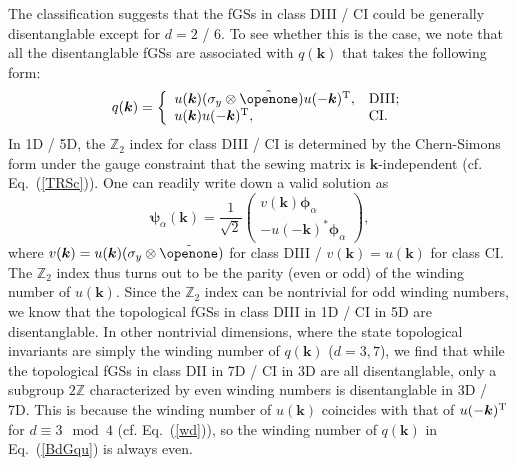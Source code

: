 \documentclass[prl,twocolumn,preprintnumbers,superscriptaddress,amsmath,amssymb]{revtex4-1}
\begin{document}
The classification suggests that the fGSs in class DIII / CI could be generally disentanglable except for $d=2$ / $6$. To see whether this is the case, we note that all the disentanglable fGSs are associated with $q(\boldsymbol{k})$ that takes the following form: 
\begin{equation}
q(\boldsymbol{k}) =\left\{\begin{array}{ll} u(\boldsymbol{k})(\sigma_y\otimes \tilde\openone)u(-\boldsymbol{k})^{\rm T}, & {\rm DIII};  \\ u(\boldsymbol{k})u(-\boldsymbol{k})^{\rm T}, & {\rm CI}. \end{array} \right.
\label{BdGqu}
\end{equation}
In 1D / 5D, the $\mathbb{Z}_2$ index for class DIII / CI is determined by the Chern-Simons form under the gauge constraint that the sewing matrix is $\boldsymbol{k}$-independent (cf. Eq.~(\ref{TRSc})). One can readily write down a valid solution as
\begin{equation}
\boldsymbol{\psi}_\alpha(\boldsymbol{k})=\frac{1}{\sqrt{2}}
\begin{pmatrix} v(\boldsymbol{k})\boldsymbol{\phi}_\alpha \\ -u(-\boldsymbol{k})^*\boldsymbol{\phi}_\alpha \end{pmatrix},
\end{equation}
where $v(\boldsymbol{k})= u(\boldsymbol{k})(\sigma_y\otimes\tilde\openone)$ for class DIII / $v(\boldsymbol{k})= u(\boldsymbol{k})$ for class CI. The $\mathbb{Z}_2$ index thus turns out to be the parity (even or odd) of the winding number of $u(\boldsymbol{k})$. Since the $\mathbb{Z}_2$ index can be nontrivial for odd winding numbers, we know that the topological fGSs in class DIII in 1D / CI in 5D are disentanglable. In other nontrivial dimensions, where the state topological invariants are simply the winding number of $q(\boldsymbol{k})$ ($d=3,7$), we find that while the topological fGSs in class DII in 7D / CI in 3D are all disentanglable, only a subgroup $2\mathbb{Z}$ characterized by even winding numbers is disentanglable in 3D / 7D. This is because the winding number of $u(\boldsymbol{k})$ coincides with that of $u(-\boldsymbol{k})^{\rm T}$ for $d\equiv 3\mod 4$ (cf. Eq.~(\ref{wd})), so the winding number of $q(\boldsymbol{k})$ in Eq.~(\ref{BdGqu}) is always even.
\end{document}
